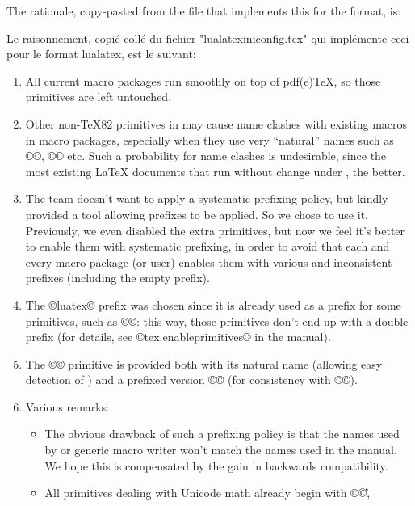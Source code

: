 \documentclass{lltxdoc}
\begin{document}
The rationale, copy-pasted from the file  that
implements this for the  format, is:

Le raisonnement, copié-collé du fichier "lualatexiniconfig.tex" qui implémente ceci pour le format lualatex, est le suivant:

\begin{myquote}
  \begin{enumerate}
    \item All current macro packages run smoothly on top of pdf(e)TeX, so
      those primitives are left untouched.
    \item Other non-TeX82 primitives in \luatex may cause name clashes with
      existing macros in macro packages, especially when they use very
      ``natural'' names such as ©\outputbox©, ©\mathstyle© etc. Such a
      probability for name clashes is undesirable, since the most existing
      LaTeX documents that run without change under \luatex, the better.
    \item The \luatex team doesn't want to apply a systematic prefixing policy,
      but kindly provided a tool allowing prefixes to be applied. So we chose
      to use it.  Previously, we even disabled the extra primitives, but now
      we feel it's better to enable them with systematic prefixing, in order
      to avoid that each and every macro package (or user) enables them with
      various and inconsistent prefixes (including the empty prefix).
    \item The ©luatex© prefix was chosen since it is already used as a prefix
      for some primitives, such as ©\luatexversion©: this way, those
      primitives don't end up with a double prefix (for details, see
      ©tex.enableprimitives© in the \luatex manual).
    \item The ©\directlua© primitive is provided both with its natural name
      (allowing easy detection of \luatex) and a prefixed version
      ©\luatexdirectlua© (for consistency with ©\luatexlatelua©).
    \item Various remarks:
      \begin{itemize}
        \item The obvious drawback of such a prefixing policy is that the
          names used by \latex or generic macro writer won't match the names
          used in the manual.  We hope this is compensated by the gain in
          backwards compatibility.
        \item All primitives dealing with Unicode math already begin with ©\U©,

\end{itemize}
\end{enumerate}
\end{myquote}
\end{document}
